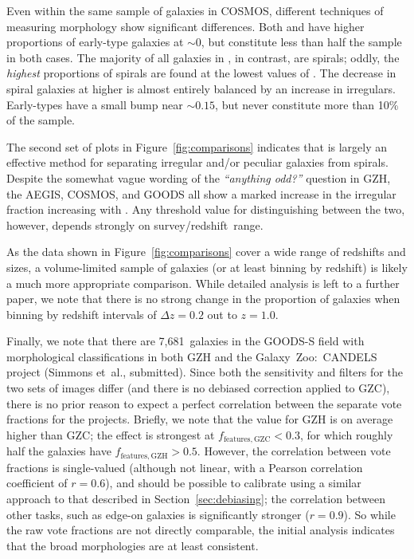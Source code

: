 \documentclass[twocolumn]{aastex6}
\begin{document}
Even within the same sample of galaxies in COSMOS, different techniques of measuring morphology show significant differences. Both \citet{cas07} and \citet{tas11} have higher proportions of early-type galaxies at \fbest$\sim0$, but constitute less than half the sample in both cases. The majority of all galaxies in \citet{sca07}, in contrast, are spirals; oddly, the \emph{highest} proportions of spirals are found at the lowest values of \fbest. The decrease in spiral galaxies at higher \fbest{} is almost entirely balanced by an increase in irregulars. Early-types have a small bump near \fbest$\sim0.15$, but never constitute more than 10\% of the sample. 

The second set of plots in Figure~\ref{fig:comparisons} indicates that \fodd{} is largely an effective method for separating irregular and/or peculiar galaxies from spirals. Despite the somewhat vague wording of the {\it ``anything odd?''} question in GZH, the AEGIS, COSMOS, and GOODS all show a marked increase in the irregular fraction increasing with \fodd. Any threshold value for distinguishing between the two, however, depends strongly on survey/redshift~range. 

As the data shown in Figure~\ref{fig:comparisons} cover a wide range of redshifts and sizes, a volume-limited sample of galaxies (or at least binning by redshift) is likely a much more appropriate comparison. While detailed analysis is left to a further paper, we note that there is no strong change in the proportion of galaxies when binning by redshift intervals of $\Delta z=0.2$ out to $z=1.0$. 

Finally, we note that there are 7,681~galaxies in the GOODS-S field with morphological classifications in both GZH and the Galaxy~Zoo:~CANDELS project (Simmons et~al., submitted). Since both the sensitivity and filters for the two sets of images differ (and there is no debiased correction applied to GZC), there is no prior reason to expect a perfect correlation between the separate vote fractions for the projects. Briefly, we note that the \ffeatures{} value for GZH is on average higher than GZC; the effect is strongest at $f_\mathrm{features,GZC}<0.3$, for which roughly half the galaxies have $f_\mathrm{features,GZH}>0.5$. However, the correlation between vote fractions is single-valued (although not linear, with a Pearson correlation coefficient of $r=0.6$), and should be possible to calibrate using a similar approach to that described in Section~\ref{sec:debiasing}; the correlation between other tasks, such as edge-on galaxies is significantly stronger ($r=0.9$). So while the raw vote fractions are not directly comparable, the initial analysis indicates that the broad morphologies are at least consistent.
\end{document}
